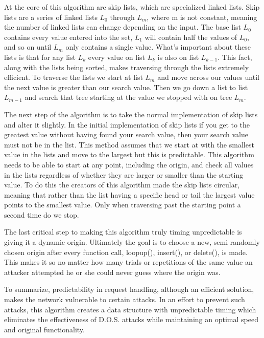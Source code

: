 \documentclass[10pt]{article}
\begin{document}
	At the core of this algorithm are skip lists, which are specialized linked lists. 
Skip lists are a series of linked lists $L_{0}$ through $L_{m}$, where m is not constant, meaning the number of linked lists can change depending on the input. The base list $L_{0}$ contains every value entered into the set, $L_{1}$ will contain half the values of $L_{0}$, and so on until $L_{m}$ only contains a single value. What's important about these lists is that for any list $L_{k}$ every value on list $L_{k}$ is also on list $L_{k-1}$. This fact, along with the lists being sorted, makes traversing through the lists extremely efficient. To traverse the 
lists we start at list $L_{m}$ and move across our values until the next value is greater 
than our search value. Then we go down a list to list $L_{m-1}$ and search that tree starting 
at the value we stopped with on tree $L_{m}$. 

	The next step of the algorithm is to take the normal implementation of skip 
lists and alter it slightly. In the initial implementation of skip lists if you
get to the greatest value without having found your search value, then your search value must not 
be in the list. This method assumes that we start at with the smallest value in 
the lists and move to the largest but this is predictable. This algorithm 
needs to be able to start at any point, including the origin, and check all values in the 
lists regardless of whether they are larger or smaller than the starting value. To do this the creators of this 
algorithm made the skip lists circular, meaning that rather than the list having a specific head or tail the largest value points to the smallest value. Only when traversing past the starting point a second time do we stop.
  
	The last critical step to making this algorithm truly timing unpredictable is giving it a 
dynamic origin. Ultimately the goal is to choose a new, semi randomly chosen 
origin after every function call, loopup(), insert(), or delete(), is made. This 
makes it so no matter how many trials or repetitions of the same value an attacker 
attempted he or she could never guess where the origin was.


	To summarize, predictability in request handling, although an efficient solution, makes the network vulnerable to certain attacks. In an effort to prevent such attacks, this algorithm creates a data structure with unpredictable timing which eliminates the effectiveness of D.O.S. attacks while maintaining an optimal speed and original functionality.
\end{document}
